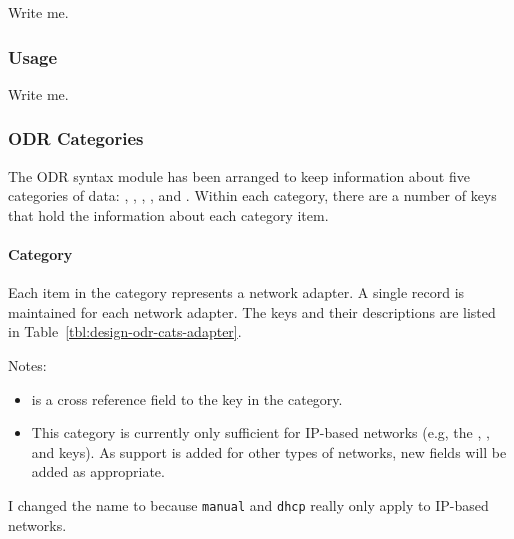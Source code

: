 Write me.

\subsubsection{ Usage}

Write me.

\subsubsection{ODR Categories}

The ODR syntax module has been arranged to keep information about five
categories of data: , ,
, , and . Within each
category, there are a number of keys that hold the information about
each category item.


\paragraph{ Category}

Each item in the  category represents a network
adapter. A single record is maintained for each network adapter.  The
keys and their descriptions are listed in
Table~\ref{tbl:design-odr-cats-adapter}.

Notes:

\begin{itemize}
\item {} is a cross reference field to the 
  key in the  category.
  
\item This category is currently only sufficient for IP-based networks
  (e.g, the , , and
   keys).  As support is added for other types of
  networks, new fields will be added as appropriate.
\end{itemize}

\begin{discuss}
  I changed the name  to  because
  {\tt manual} and {\tt dhcp} really only apply to IP-based networks.
\end{discuss}

